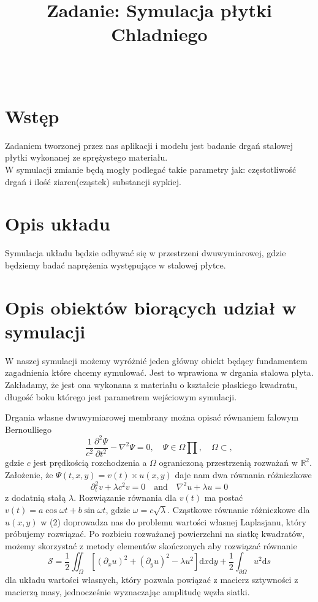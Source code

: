 \documentclass{classrep}
\author{%
  \studentinfo[210347@edu.p.lodz.pl]{Krzysztof Wierzbicki}{210347}\\
  \studentinfo[210209@edu.p.lodz.pl]{Bartosz Jurczewski}{210209}%
}
\title{Zadanie: Symulacja płytki Chladniego }
\begin{document}
\maketitle
\thispagestyle{fancyplain}

\newpage

\section{Wstęp}
Zadaniem tworzonej przez nas aplikacji i modelu jest badanie drgań stalowej płytki wykonanej ze sprężystego materiału. \\
W symulacji zmianie będą mogły podlegać takie parametry jak: częstotliwość drgań i ilość ziaren(cząstek) substancji sypkiej.

\section{Opis układu}
Symulacja układu będzie odbywać się w przestrzeni dwuwymiarowej, gdzie będziemy badać naprężenia występujące w stalowej płytce. 

\section{Opis obiektów biorących udział w symulacji}
W naszej symulacji możemy wyróżnić jeden główny obiekt będący fundamentem zagadnienia które chcemy symulować. Jest to wprawiona w drgania stalowa płyta. Zakładamy, że jest ona wykonana z materiału o kształcie płaskiego kwadratu, długość boku którego jest parametrem wejściowym symulacji.

Drgania własne dwuwymiarowej membrany można opisać równaniem falowym Bernoulliego
\begin{equation}
\frac{1}{c^2}\frac{\partial^2 \Psi}{\partial t^2}-\nabla ^2 \Psi = 0,\quad
\Psi \in \Omega \prod %
,\quad
\Omega \subset,
\end{equation}
gdzie $c$ jest prędkością rozchodzenia a $\Omega$ ograniczoną przestrzenią rozważań w $\mathbb{R}^2$.
Założenie, że $\Psi(t, x, y) = v(t) \times u(x, y)$ daje nam dwa równania różniczkowe
\begin{equation}
\partial^2_t v+\lambda c^2v=0
\quad \mathrm{and} \quad
\nabla ^2 u +\lambda u=0
\end{equation}
z dodatnią stałą $\lambda$.
Rozwiązanie równania dla $v(t)$ ma postać $v(t)=a \cos{\omega t}+b \sin{\omega t}$, gdzie $\omega=c \sqrt{\lambda}$. Cząstkowe równanie różniczkowe dla $u(x, y)$ w (2) doprowadza nas do problemu wartości własnej Laplasjanu, który próbujemy rozwiązać.
Po rozbiciu rozważanej powierzchni na siatkę kwadratów, możemy skorzystać z metody elementów skończonych aby rozwiązać równanie 
\begin{equation}
\mathcal{S} = \frac{1}{2}\iint_\Omega [(\partial_x u)^2+(\partial_y u)^2-\lambda u^2]\mathrm{d}x\mathrm{d}y+\frac{1}{2}\int_{\partial \Omega} u^2\mathrm{d}s
\end{equation}
dla układu wartości własnych, który pozwala powiązać z macierz sztywności z macierzą masy, jednocześnie wyznaczając
amplitudę węzła siatki. 
\end{document}
